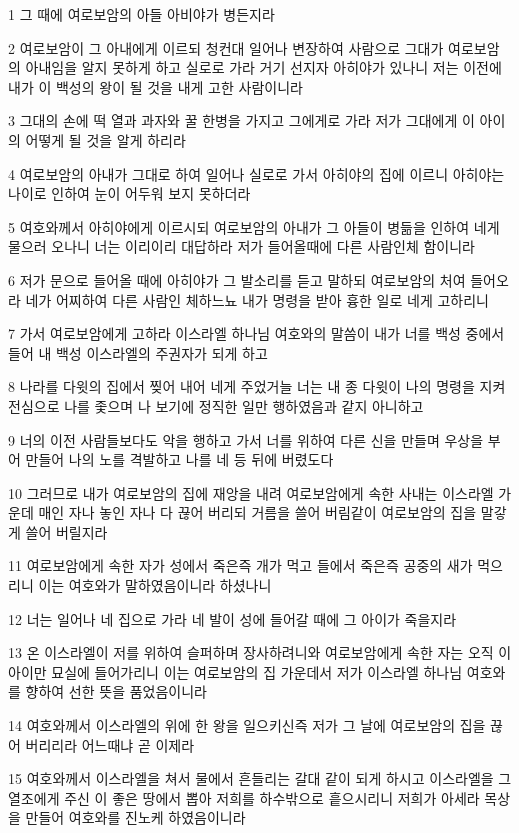 \par 1 그 때에 여로보암의 아들 아비야가 병든지라
\par 2 여로보암이 그 아내에게 이르되 청컨대 일어나 변장하여 사람으로 그대가 여로보암의 아내임을 알지 못하게 하고 실로로 가라 거기 선지자 아히야가 있나니 저는 이전에 내가 이 백성의 왕이 될 것을 내게 고한 사람이니라
\par 3 그대의 손에 떡 열과 과자와 꿀 한병을 가지고 그에게로 가라 저가 그대에게 이 아이의 어떻게 될 것을 알게 하리라
\par 4 여로보암의 아내가 그대로 하여 일어나 실로로 가서 아히야의 집에 이르니 아히야는 나이로 인하여 눈이 어두워 보지 못하더라
\par 5 여호와께서 아히야에게 이르시되 여로보암의 아내가 그 아들이 병듦을 인하여 네게 물으러 오나니 너는 이리이리 대답하라 저가 들어올때에 다른 사람인체 함이니라
\par 6 저가 문으로 들어올 때에 아히야가 그 발소리를 듣고 말하되 여로보암의 처여 들어오라 네가 어찌하여 다른 사람인 체하느뇨 내가 명령을 받아 흉한 일로 네게 고하리니
\par 7 가서 여로보암에게 고하라 이스라엘 하나님 여호와의 말씀이 내가 너를 백성 중에서 들어 내 백성 이스라엘의 주권자가 되게 하고
\par 8 나라를 다윗의 집에서 찢어 내어 네게 주었거늘 너는 내 종 다윗이 나의 명령을 지켜 전심으로 나를 좇으며 나 보기에 정직한 일만 행하였음과 같지 아니하고
\par 9 너의 이전 사람들보다도 악을 행하고 가서 너를 위하여 다른 신을 만들며 우상을 부어 만들어 나의 노를 격발하고 나를 네 등 뒤에 버렸도다
\par 10 그러므로 내가 여로보암의 집에 재앙을 내려 여로보암에게 속한 사내는 이스라엘 가운데 매인 자나 놓인 자나 다 끊어 버리되 거름을 쓸어 버림같이 여로보암의 집을 말갛게 쓸어 버릴지라
\par 11 여로보암에게 속한 자가 성에서 죽은즉 개가 먹고 들에서 죽은즉 공중의 새가 먹으리니 이는 여호와가 말하였음이니라 하셨나니
\par 12 너는 일어나 네 집으로 가라 네 발이 성에 들어갈 때에 그 아이가 죽을지라
\par 13 온 이스라엘이 저를 위하여 슬퍼하며 장사하려니와 여로보암에게 속한 자는 오직 이 아이만 묘실에 들어가리니 이는 여로보암의 집 가운데서 저가 이스라엘 하나님 여호와를 향하여 선한 뜻을 품었음이니라
\par 14 여호와께서 이스라엘의 위에 한 왕을 일으키신즉 저가 그 날에 여로보암의 집을 끊어 버리리라 어느때냐 곧 이제라
\par 15 여호와께서 이스라엘을 쳐서 물에서 흔들리는 갈대 같이 되게 하시고 이스라엘을 그 열조에게 주신 이 좋은 땅에서 뽑아 저희를 하수밖으로 흩으시리니 저희가 아세라 목상을 만들어 여호와를 진노케 하였음이니라
